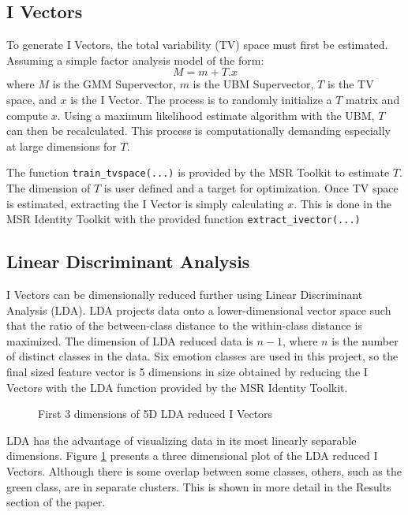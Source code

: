 \subsection{I Vectors}
	To generate I Vectors, the total variability (TV) space must first be estimated. Assuming a simple factor analysis model of the form:
	\begin{equation}
		M = m + T . x
	\end{equation}
	where $M$ is the GMM Supervector, $m$ is the UBM Supervector, $T$ is the TV space, and $x$ is the I Vector. The process is to randomly initialize a $T$ matrix and compute $x$. Using a maximum likelihood estimate algorithm with the UBM, $T$ can then be recalculated. This process is computationally demanding especially at large dimensions for $T$.
	
	The function \verb|train_tvspace(...)| is provided by the MSR Toolkit to estimate $T$. The dimension of $T$ is user defined and a target for optimization. Once TV space is estimated, extracting the I Vector is simply calculating $x$. This is done in the MSR Identity Toolkit with the provided function \verb|extract_ivector(...)|
	
\subsection{Linear Discriminant Analysis}
	I Vectors can be dimensionally reduced further using Linear Discriminant Analysis (LDA). LDA projects data onto a lower-dimensional vector space such that the ratio of the between-class distance to the within-class distance is maximized. The dimension of LDA reduced data is $n-1$, where $n$ is the number of distinct classes in the data. Six emotion classes are used in this project, so the final sized feature vector is 5 dimensions in size obtained by reducing the I Vectors with the LDA function provided by the MSR Identity Toolkit.  
	
	\begin{figure}[!htb]
		\caption{\label{fig:3dlda} First 3 dimensions of 5D LDA reduced I Vectors}
	\end{figure}

	LDA has the advantage of visualizing data in its most linearly separable dimensions. Figure \ref{fig:3dlda} presents a three dimensional plot of the LDA reduced I Vectors. Although there is some overlap between some classes, others, such as the green class, are in separate clusters. This is shown in more detail in the Results section of the paper.
